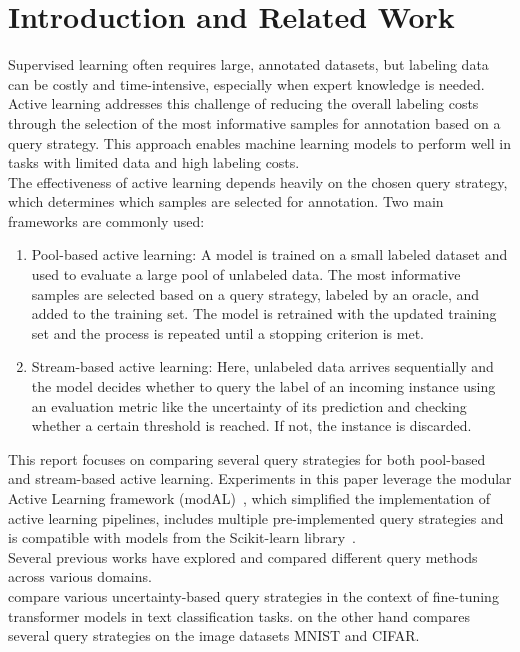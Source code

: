 \documentclass{article}
\theoremstyle{plain}
\theoremstyle{definition}
\theoremstyle{remark}
\begin{document}
\section{Introduction and Related Work}\label{sec:intro}
Supervised learning often requires large, annotated datasets, but labeling data can be costly and time-intensive, especially when expert knowledge is needed. 
Active learning addresses this challenge of reducing the overall labeling costs through the selection of the most informative samples for annotation based on a query strategy. This approach enables machine learning models to perform well in tasks with limited data and high labeling costs. \\
The effectiveness of active learning depends heavily on the chosen query strategy, which determines which samples are selected for annotation. Two main frameworks are commonly used:
\begin{enumerate}
	\item Pool-based active learning: A model is trained on a small labeled dataset and used to evaluate a large pool of unlabeled data. The most informative samples are selected based on a query strategy, labeled by an oracle, and added to the training set. The model is retrained with the updated training set and the process is repeated until a stopping criterion is met.
	\item Stream-based active learning: Here, unlabeled data arrives sequentially and the model decides whether to query the label of an incoming instance using an evaluation metric like the uncertainty of its prediction and checking whether a certain threshold is reached. If not, the instance is discarded.
\end{enumerate}
This report focuses on comparing several query strategies for both pool-based and stream-based active learning. Experiments in this paper leverage the modular Active Learning framework (modAL)~\cite{danka_modalmodularactivelearning}, which simplified the implementation of active learning pipelines, includes multiple pre-implemented query strategies and is compatible with models from the Scikit-learn library~\cite{scikit-learn}. \\
Several previous works have explored and compared different query methods across various domains. \\
\cite{schröder_revisitinguncertaintybasedquerystrategies} compare various uncertainty-based query strategies in the context of fine-tuning transformer models in text classification tasks. \cite{zhan_comparativesurveydeepactive} on the other hand compares several query strategies on the image datasets MNIST and CIFAR. \\
\end{document}

